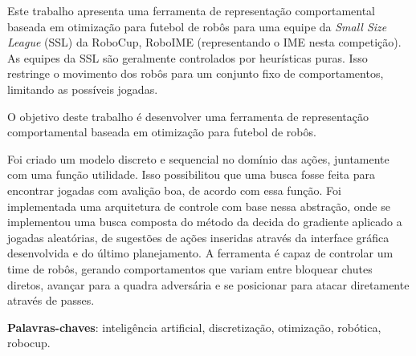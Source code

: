 \setlength{\absparsep}{18pt} %
\begin{resumo}


  Este trabalho apresenta uma ferramenta de representação comportamental baseada
  em otimização para futebol de robôs para uma equipe da \textit{Small Size
  League} (SSL) da RoboCup, RoboIME (representando o IME nesta competição).  As
  equipes da SSL são geralmente controlados por heurísticas puras.  Isso
  restringe o movimento dos robôs para um conjunto fixo de comportamentos,
  limitando as possíveis jogadas.

  O objetivo deste trabalho é desenvolver uma ferramenta de representação
  comportamental baseada em otimização para futebol de robôs.

  Foi criado um modelo discreto e sequencial no domínio das ações,
  juntamente com uma função utilidade. Isso possibilitou que uma busca
  fosse feita para encontrar jogadas com avalição boa, de acordo com
  essa função. Foi implementada uma arquitetura de controle com base
  nessa abstração, onde se implementou uma busca composta do método da decida
  do gradiente aplicado a jogadas aleatórias, de sugestões de ações inseridas
  através da interface gráfica desenvolvida e do último planejamento. 
  A ferramenta é capaz de controlar um time de robôs, gerando
  comportamentos que variam entre bloquear chutes diretos, avançar para a quadra
  adversária e se posicionar para atacar diretamente através de passes.

  \textbf{Palavras-chaves}: inteligência artificial, discretização, otimização, robótica, robocup.
\end{resumo}

